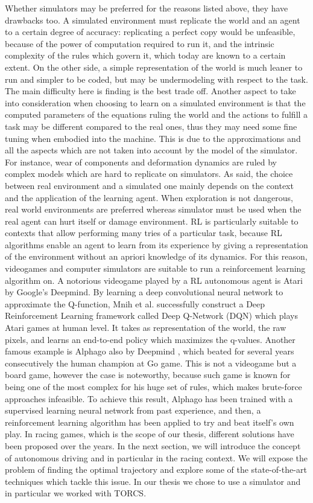 Whether simulators may be preferred for the reasons listed above, they have drawbacks too. A simulated environment must replicate the world and an agent to a certain degree of accuracy: replicating a perfect copy would be unfeasible, because of the power of computation required to run it, and the intrinsic complexity of the rules which govern it, which today are known to a certain extent. On the other side, a simple representation of the world is much leaner to run and simpler to be coded, but may be undermodeling with respect to the task. The main difficulty here is finding is the best trade off.
Another aspect to take into consideration when choosing to learn on a simulated environment is that the computed parameters of the equations ruling the world and the actions to fulfill a task may be different compared to the real ones, thus they may need some fine tuning when embodied into the machine. This is due to the approximations and all the aspects which are not taken into account by the model of the simulator. For instance, wear of components and deformation dynamics are ruled by complex models which are hard to replicate on simulators.
As said, the choice between real environment and a simulated one mainly depends on the context and the application of the learning agent. When exploration is not dangerous, real world environments are preferred whereas simulator must be used when the real agent can hurt itself or damage environment.
RL is particularly suitable to contexts that allow performing many tries of a particular task, because RL algorithms enable an agent to learn from its experience by giving a representation of the environment without an apriori knowledge of its dynamics. For this reason, videogames and computer simulators are suitable to run a reinforcement learning algorithm on.
A notorious videogame played by a RL autonomous agent is Atari \cite{atari} by Google's Deepmind. By learning a deep convolutional neural network to approximate the Q-function, Mnih et al. successfully construct a Deep Reinforcement Learning framework called Deep Q-Network (DQN) which plays Atari games at human level. It takes as representation of the world, the raw pixels, and learns an end-to-end policy which maximizes the q-values.
Another famous example is Alphago also by Deepmind \cite{alphago}, which beated for several years consecutively the human champion at Go game. This is not a videogame but a board game, however the case is noteworthy, because such game is known for being one of the most complex  for his huge set of rules, which makes brute-force approaches infeasible. To achieve this result, Alphago has been trained with a supervised learning neural network from past experience, and then, a reinforcement learning algorithm has been applied to try and beat itself's own play. 
In racing games, which is the scope of our thesis, different solutions have been proposed over the years. In the next section, we will introduce the concept of autonomous driving and in particular in the racing context. We will expose the problem of finding the optimal trajectory and explore some of the state-of-the-art techniques which tackle this issue.
In our thesis we chose to use a simulator and in particular we worked with TORCS.

